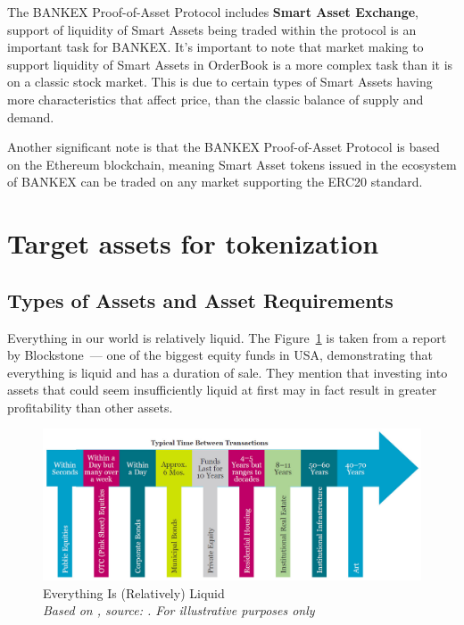 \documentclass{article}
\begin{document}
\begin{multicols}{2}
The BANKEX Proof-of-Asset Protocol includes \textbf{Smart Asset Exchange}, support of liquidity of Smart Assets being traded within the protocol is an important task for BANKEX. It’s important to note that market making to support liquidity of Smart Assets in OrderBook is a more complex task than it is on a classic stock market. This is due to certain types of Smart Assets having more characteristics that affect price, than the classic balance of supply and demand. 

Another significant note is that the BANKEX Proof-of-Asset Protocol is based on the Ethereum blockchain, meaning Smart Asset tokens issued in the ecosystem of BANKEX can be traded on any market supporting the ERC20 standard.

\section{Target assets for tokenization}

\subsection{Types of Assets and Asset Requirements}

Everything in our world is relatively liquid. The Figure~\ref{fig:blackstone} is taken from a report \cite{blackstone2015} by Blockstone~--- one of the biggest equity funds in USA, demonstrating that everything is liquid and has a duration of sale. They mention that investing into assets that could seem insufficiently liquid at first may in fact result in greater profitability than other assets.

\begin{figure}
  \centering
  \includegraphics[width=\textwidth]{blackstone.png}
  \caption{Everything Is (Relatively) Liquid\\\textit{Based on \cite{blackstone2015}, source: \cite{ilmanen2011expected}. For illustrative purposes only}}
  \label{fig:blackstone}
\end{figure}


\end{multicols}
\end{document}
